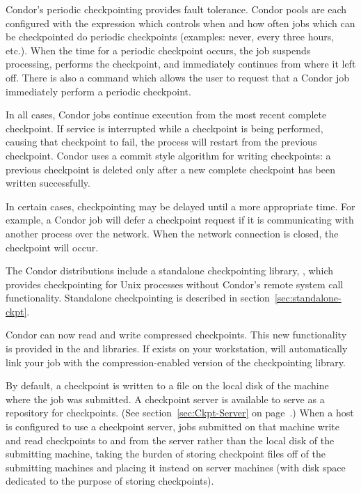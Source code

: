 Condor's periodic checkpointing provides fault tolerance.  Condor
pools are each configured with the 
expression which controls when and how often jobs which can be
checkpointed do periodic checkpoints (examples: never, every three
hours, etc.).  When the time for a periodic checkpoint occurs, the job
suspends processing, performs the checkpoint, and immediately
continues from where it left off.  There is also a  command
which allows the user to request that a Condor job immediately perform
a periodic checkpoint.

In all cases, Condor jobs continue execution from the most recent
complete checkpoint.  If service is interrupted while a checkpoint is
being performed, causing that checkpoint to fail, the process will
restart from the previous checkpoint.  Condor uses a commit style
algorithm for writing checkpoints: a previous checkpoint is deleted
only after a new complete checkpoint has been written successfully.

In certain cases, checkpointing may be delayed until a more appropriate
time.  For example, a Condor job will defer a checkpoint request if
it is communicating with another process over the network.  When the
network connection is closed, the checkpoint will occur.

The Condor distributions include a standalone checkpointing library,
, which provides checkpointing for Unix
processes without Condor's remote system call functionality.
Standalone checkpointing is described in
section~\ref{sec:standalone-ckpt}.

Condor can now read and write compressed checkpoints.  This new
functionality is provided in the  and
 libraries.  
If  exists on your workstation, 
will automatically link your job with the compression-enabled version
of the checkpointing library.

By default, a checkpoint is written to a file on the local disk of the
machine where the job was submitted.  A checkpoint server is available
to serve as a repository for checkpoints.  (See
section~\ref{sec:Ckpt-Server} on page~\pageref{sec:Ckpt-Server}.)
When a host is configured to use a checkpoint server, jobs submitted
on that machine write and read checkpoints to and from the server
rather than the local disk of the submitting machine, taking the
burden of storing checkpoint files off of the submitting machines and
placing it instead on server machines (with disk space dedicated to
the purpose of storing checkpoints).

